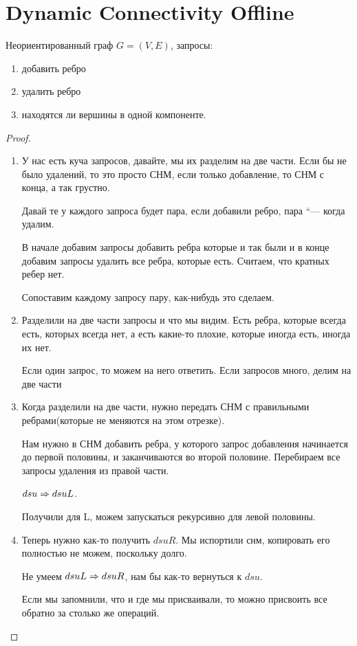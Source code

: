 \section{Dynamic Connectivity Offline}

Неориентированный граф $G = (V, E)$, запросы:
    \begin{enumerate}
    \item добавить ребро
    \item удалить ребро
    \item находятся ли вершины в одной компоненте. 
    \end{enumerate}
\begin{proof}
\begin{enumerate}
\item
У нас есть куча запросов, давайте, мы их разделим на две части. Если бы не было удалений, то это просто СНМ, если только 
добавление, то СНМ с конца, а так грустно. 

Давай те у каждого запроса будет пара, если добавили ребро, пара “--- когда удалим. 

В начале добавим запросы добавить ребра которые и так были и в конце добавим запросы удалить все ребра, которые есть. Считаем, что
кратных ребер нет.

Сопоставим каждому запросу пару, как-нибудь это сделаем. 
\item Разделили на две части запросы и что мы видим. 
Есть ребра, которые всегда есть, которых всегда нет, а есть какие-то плохие,
которые иногда есть, иногда их нет.

Если один запрос, то можем на него ответить. Если 
запросов много, делим на две части
\item 
Когда разделили на две части, нужно передать СНМ с правильными ребрами(которые не меняются на этом отрезке).

Нам нужно в СНМ добавить ребра, у которого запрос добавления начинается до первой половины, и заканчиваются во второй половине. 
Перебираем все запросы удаления из правой части.

$dsu \Rightarrow dsuL$.

Получили для L, можем запускаться рекурсивно для левой половины.

\item Теперь нужно как-то получить $dsuR$. Мы испортили снм, копировать
его полностью не можем, поскольку долго. 

Не умеем $dsuL \Rightarrow dsuR$, нам бы как-то вернуться к $dsu$.

Если мы запомнили, что и где мы присваивали, то можно присвоить все обратно за 
столько же операций. 


\end{enumerate}
\end{proof}
